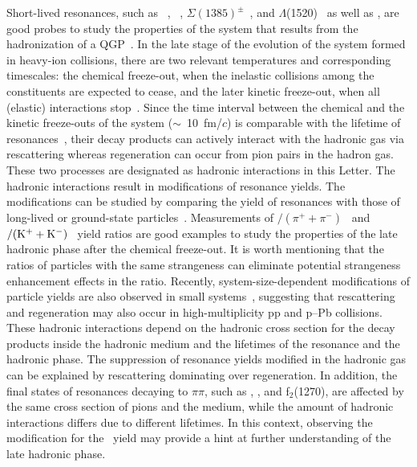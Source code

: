 Short-lived resonances, such as \rhoz~\cite{ALICE:2018qdv}, \kstar~\cite{ALICE:2019etb, ALICE:2016sak}, $\Sigma(1385)^{\pm}$~\cite{ALICE:2022zuc}, and $\Lambda$(1520)~\cite{ALICE:2018ewo} as well as \fzero, are good probes to study the properties of the system that results from the hadronization of a QGP~\cite{Bierlich:2021poz, Knospe:2015nva}. In the late stage of the evolution of the system formed in heavy-ion collisions, there are two relevant temperatures and corresponding timescales: the chemical freeze-out, when the inelastic collisions among the constituents are expected to cease, and the later kinetic freeze-out, when all (elastic) interactions stop~\cite{Song:1996ik}. Since the time interval between the chemical and the kinetic freeze-outs of the system ($\sim$~10~fm/$c$) is comparable with the lifetime of resonances~\cite{ALICE:2011dyt, ALICE:2019xyr}, their decay products can actively interact with the hadronic gas via rescattering whereas regeneration can occur from pion pairs in the hadron gas. These two processes are designated as hadronic interactions in this Letter. The hadronic interactions result in modifications of resonance yields. The modifications can be studied by comparing the yield of resonances with those of long-lived or ground-state particles~\cite{ALICE:2018pal}. Measurements of \rhoz$/(\pi^{+}+\pi^{-})$~\cite{ALICE:2018qdv} and \kstar$\rm{}/(K^{+}+K^{-})$~\cite{ALICE:2019etb, ALICE:2016sak} yield ratios are good examples to study the properties of the late hadronic phase after the chemical freeze-out. It is worth mentioning that the ratios of particles with the same strangeness can eliminate potential strangeness enhancement effects in the ratio. Recently, system-size-dependent modifications of particle yields are also observed in small systems~\cite{ALICE:2016sak, ALICE:2019etb}, suggesting that rescattering and regeneration may also occur in high-multiplicity pp and p--Pb collisions. These hadronic interactions depend on the hadronic cross section for the decay products inside the hadronic medium and the lifetimes of the resonance and the hadronic phase. The suppression of resonance yields modified in the hadronic gas can be explained by rescattering dominating over regeneration. In addition, the final states of resonances decaying to $\pi\pi$, such as \fzero, \rhoz, and f$_{2}$(1270), are affected by the same cross section of pions and the medium, while the amount of hadronic interactions differs due to different lifetimes. In this context, observing the modification for the \fzero~yield may provide a hint at further understanding of the late hadronic phase.

